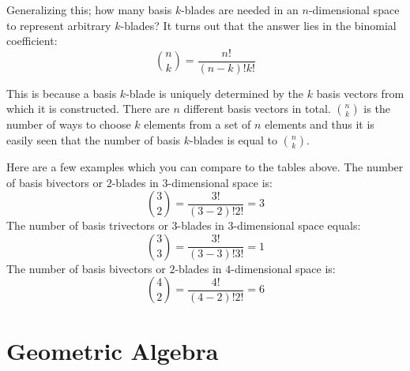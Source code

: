 \documentclass[10pt]{report}
\begin{document}
Generalizing this; how many basis $k$-blades are needed in an
$n$-dimensional space to represent arbitrary $k$-blades? It turns
out that the answer lies in the binomial coefficient:
\begin{displaymath}
    \label{eq:num basis blades for grade}
    \binom{n}{k} = \frac{n!}{(n-k)!k!}
\end{displaymath}

This is because a basis $k$-blade is uniquely determined by the
$k$ basis vectors from which it is constructed. There are $n$
different basis vectors in total. $\binom{n}{k}$ is the number of
ways to choose $k$ elements from a set of $n$ elements and thus it
is easily seen that the number of basis $k$-blades is equal to
$\binom{n}{k}$.

Here are a few examples which you can compare to the tables above.
The number of basis bivectors or $2$-blades in $3$-dimensional
space is:
\begin{displaymath}
    \binom{3}{2} = \frac{3!}{(3-2)!2!}= 3
\end{displaymath}
The number of basis trivectors or $3$-blades in $3$-dimensional
space equals:
\begin{displaymath}
    \binom{3}{3}= \frac{3!}{(3-3)!3!}= 1
\end{displaymath}
The number of basis bivectors or $2$-blades in $4$-dimensional
space is:
\begin{displaymath}
    \binom{4}{2} = \frac{4!}{(4-2)!2!}= 6
\end{displaymath}

\chapter{Geometric Algebra}
\end{document}
